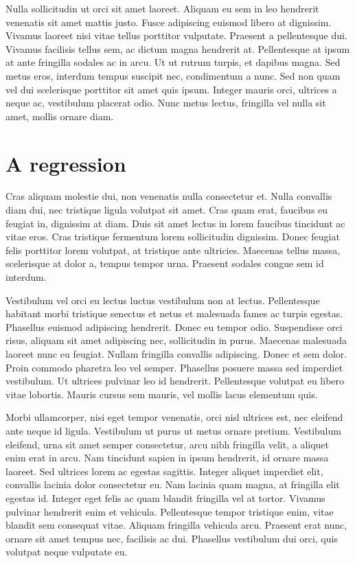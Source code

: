 \documentclass[11pt,a4paper]{memoir}\usepackage[]{graphicx}\usepackage[]{color}
\begin{document}
Nulla sollicitudin ut orci sit amet laoreet. Aliquam eu sem in leo hendrerit venenatis sit amet mattis justo. Fusce adipiscing euismod libero at dignissim. Vivamus laoreet nisi vitae tellus porttitor vulputate. Praesent a pellentesque dui. Vivamus facilisis tellus sem, ac dictum magna hendrerit at. Pellentesque at ipsum at ante fringilla sodales ac in arcu. Ut ut rutrum turpis, et dapibus magna. Sed metus eros, interdum tempus suscipit nec, condimentum a nunc. Sed non quam vel dui scelerisque porttitor sit amet quis ipsum. Integer mauris orci, ultrices a neque ac, vestibulum placerat odio. Nunc metus lectus, fringilla vel nulla sit amet, mollis ornare diam.

\section{A regression}
Cras aliquam molestie dui, non venenatis nulla consectetur et. Nulla convallis diam dui, nec tristique ligula volutpat sit amet. Cras quam erat, faucibus eu feugiat in, dignissim at diam. Duis sit amet lectus in lorem faucibus tincidunt ac vitae eros. Cras tristique fermentum lorem sollicitudin dignissim. Donec feugiat felis porttitor lorem volutpat, at tristique ante ultricies. Maecenas tellus massa, scelerisque at dolor a, tempus tempor urna. Praesent sodales congue sem id interdum.

Vestibulum vel orci eu lectus luctus vestibulum non at lectus. Pellentesque habitant morbi tristique senectus et netus et malesuada fames ac turpis egestas. Phasellus euismod adipiscing hendrerit. Donec eu tempor odio. Suspendisse orci risus, aliquam sit amet adipiscing nec, sollicitudin in purus. Maecenas malesuada laoreet nunc eu feugiat. Nullam fringilla convallis adipiscing. Donec et sem dolor. Proin commodo pharetra leo vel semper. Phasellus posuere massa sed imperdiet vestibulum. Ut ultrices pulvinar leo id hendrerit. Pellentesque volutpat eu libero vitae lobortis. Mauris cursus sem mauris, vel mollis lacus elementum quis.

Morbi ullamcorper, nisi eget tempor venenatis, orci nisl ultrices est, nec eleifend ante neque id ligula. Vestibulum ut purus ut metus ornare pretium. Vestibulum eleifend, urna sit amet semper consectetur, arcu nibh fringilla velit, a aliquet enim erat in arcu. Nam tincidunt sapien in ipsum hendrerit, id ornare massa laoreet. Sed ultrices lorem ac egestas sagittis. Integer aliquet imperdiet elit, convallis lacinia dolor consectetur eu. Nam lacinia quam magna, at fringilla elit egestas id. Integer eget felis ac quam blandit fringilla vel at tortor. Vivamus pulvinar hendrerit enim et vehicula. Pellentesque tempor tristique enim, vitae blandit sem consequat vitae. Aliquam fringilla vehicula arcu. Praesent erat nunc, ornare sit amet tempus nec, facilisis ac dui. Phasellus vestibulum dui orci, quis volutpat neque vulputate eu.
\end{document}
